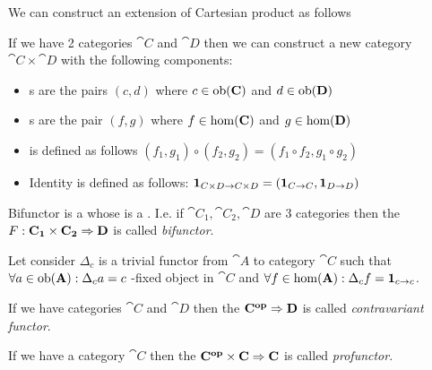 We can construct an extension of Cartesian product as follows
\begin{definition}
\label{def:category_product}
If we have 2 categories $\cat{C}$ and $\cat{D}$ then we can construct
a new category $\cat{C} \times \cat{D}$ with the following components:
\begin{itemize}
\item {}s are the pairs $(c,d)$ where $c \in
  \mathrm{ob}(\mathbf{C})$ and $d \in \mathrm{ob}(\mathbf{D})$
\item {}s are the pair $(f,g)$ where $f \in
  \mathrm{hom}(\mathbf{C})$ and $g \in \mathrm{hom}(\mathbf{D})$
\item {} is defined as follows 
\(
(f_1, g_1) \circ (f_2, g_2) = (f_1 \circ f_2, g_1 \circ g_2)
\)
\item Identity is defined as follows: $\mathbf{1}_{ C \times D \to C \times D } = 
\left(\mathbf{1}_{ C \to C }, \mathbf{1}_{ D \to D }\right)$
\end{itemize}
\end{definition}

\begin{definition}[Bifunctor]
\label{def:bifunctor}
Bifunctor is a  whose  is
a . I.e. if $\cat{C_1}, \cat{C_2},
\cat{D}$ are 3 categories then the  
\(
F: \mathbf{C_1} \times \mathbf{C_2} \Rightarrow \mathbf{D}
\) is called \textit{bifunctor}.
\end{definition}

\begin{definition}
\label{def:terminal_object_cat}
Let consider $\Delta_c$ is a trivial functor from 
$\cat{A}$ to category $\cat{C}$ such that $\forall a \in \mathrm{ob}(\mathbf{A}):
\Delta_c a = c$ -fixed object in $\cat{C}$ and 
$\forall f \in \mathrm{hom}(\mathbf{A}): \Delta_c f = \mathbf{1}_{ c \to c }$.
\end{definition}

\begin{definition}
\label{def:contravariant_functor}
If we have categories $\cat{C}$ and $\cat{D}$ then the
 $\mathbf{C^{op}} \Rightarrow \mathbf{D}$ is called
\textit{contravariant functor}. 
\end{definition}

\begin{definition}[Profunctor]
\label{def:profunctor}
If we have a category $\cat{C}$ then the 
$\mathbf{C^{op}} \times \mathbf{C} \Rightarrow \mathbf{C}$ is called
\textit{profunctor}. 
\end{definition}

